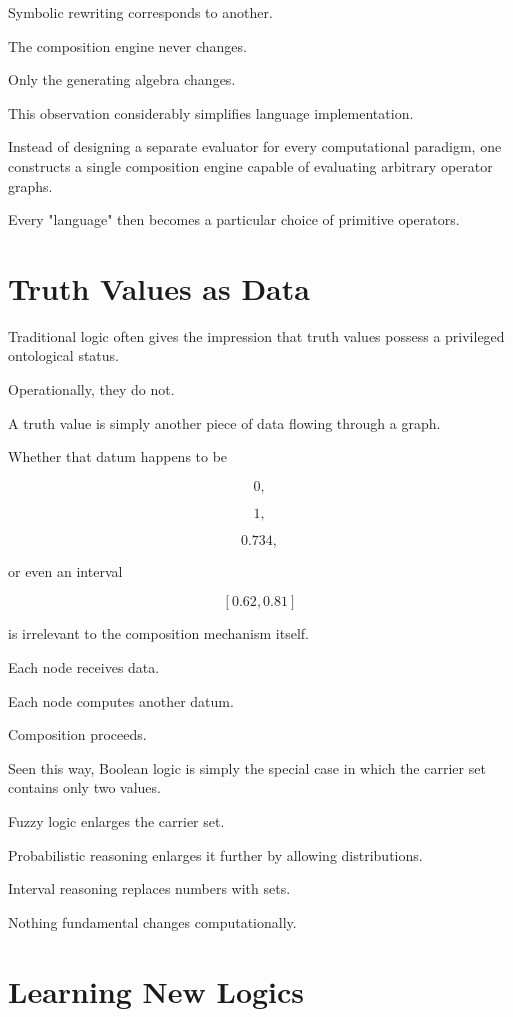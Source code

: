 \documentclass[12pt,oneside]{article}
\begin{document}
Symbolic rewriting corresponds to another.

The composition engine never changes.

Only the generating algebra changes.

This observation considerably simplifies language implementation.

Instead of designing a separate evaluator for every computational paradigm, one constructs a single composition engine capable of evaluating arbitrary operator graphs.

Every "language" then becomes a particular choice of primitive operators.

\section{Truth Values as Data}

Traditional logic often gives the impression that truth values possess a privileged ontological status.

Operationally, they do not.

A truth value is simply another piece of data flowing through a graph.

Whether that datum happens to be

\[
0,
\]

\[
1,
\]

\[
0.734,
\]

or even an interval

\[
[0.62,0.81]
\]

is irrelevant to the composition mechanism itself.

Each node receives data.

Each node computes another datum.

Composition proceeds.

Seen this way, Boolean logic is simply the special case in which the carrier set contains only two values.

Fuzzy logic enlarges the carrier set.

Probabilistic reasoning enlarges it further by allowing distributions.

Interval reasoning replaces numbers with sets.

Nothing fundamental changes computationally.

\section{Learning New Logics}
\end{document}
